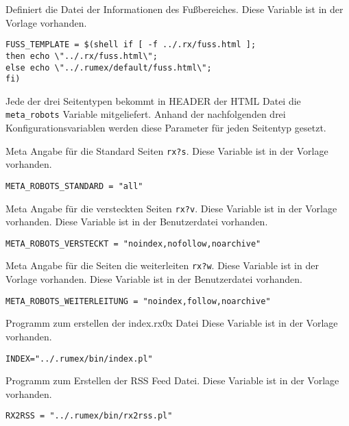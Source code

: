 {Definiert die Datei der Informationen des Fußbereiches.}
{Diese Variable ist in der Vorlage vorhanden.}
{}
{\scriptsize
\begin{Verbatim}
FUSS_TEMPLATE = $(shell if [ -f ../.rx/fuss.html ];
then echo \"../.rx/fuss.html\";
else echo \"../.rumex/default/fuss.html\";
fi)
\end{Verbatim}
}


Jede der drei Seitentypen bekommt in HEADER der HTML
Datei die \verb|meta_robots| Variable mitgeliefert.
Anhand der nachfolgenden drei Konfigurationsvariablen
werden diese Parameter für jeden Seitentyp gesetzt.


{Meta Angabe für die Standard Seiten \texttt{rx?s}. }
{Diese Variable ist in der Vorlage vorhanden.}
{}
{\scriptsize
\begin{Verbatim}
META_ROBOTS_STANDARD = "all"
\end{Verbatim}
}



{Meta Angabe für die versteckten Seiten \texttt{rx?v}. }
{Diese Variable ist in der Vorlage vorhanden.}
{Diese Variable ist in der Benutzerdatei vorhanden.}
{\scriptsize
\begin{Verbatim}
META_ROBOTS_VERSTECKT = "noindex,nofollow,noarchive"
\end{Verbatim}
}


{Meta Angabe für die Seiten die weiterleiten \texttt{rx?w}. }
{Diese Variable ist in der Vorlage vorhanden.}
{Diese Variable ist in der Benutzerdatei vorhanden.}
{\scriptsize
\begin{Verbatim}
META_ROBOTS_WEITERLEITUNG = "noindex,follow,noarchive"
\end{Verbatim}
}



{Programm zum erstellen der index.rx0x Datei}
{Diese Variable ist in der Vorlage vorhanden.}
{}
{\scriptsize
\begin{Verbatim}
INDEX="../.rumex/bin/index.pl"
\end{Verbatim}
}




{Programm zum Erstellen der RSS Feed Datei.}
{Diese Variable ist in der Vorlage vorhanden.}
{}
{\scriptsize
\begin{Verbatim}
RX2RSS = "../.rumex/bin/rx2rss.pl"
\end{Verbatim}
}




